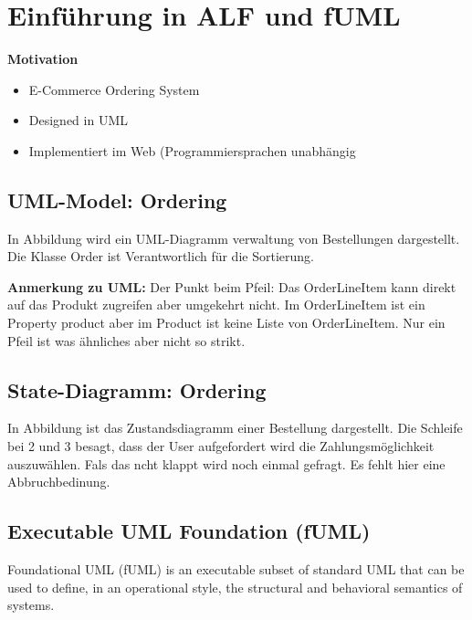 \chapter{Einführung in ALF und fUML}

\textbf{Motivation}
\begin{itemize}
\item E-Commerce Ordering System
\item Designed in UML
\item Implementiert im Web (Programmiersprachen unabhängig
\end{itemize}

\section{UML-Model: Ordering}


In Abbildung  wird ein UML-Diagramm verwaltung von Bestellungen dargestellt. Die Klasse Order ist Verantwortlich für die Sortierung.

\textbf{Anmerkung zu UML:}
Der Punkt beim Pfeil: Das OrderLineItem kann direkt auf das Produkt zugreifen aber umgekehrt nicht. Im OrderLineItem ist ein Property product aber im Product ist keine Liste von OrderLineItem. Nur ein Pfeil ist was ähnliches aber nicht so strikt.

\section{State-Diagramm: Ordering}


In Abbildung  ist das Zustandsdiagramm einer Bestellung dargestellt. Die Schleife bei 2 und 3 besagt, dass der User aufgefordert wird die Zahlungsmöglichkeit auszuwählen. Fals das ncht klappt wird noch einmal gefragt. Es fehlt hier eine Abbruchbedinung.

\section{Executable UML Foundation (fUML)}

Foundational UML (fUML) is an executable subset of standard UML that can be used to define, in an operational style, the structural and behavioral semantics of systems.

